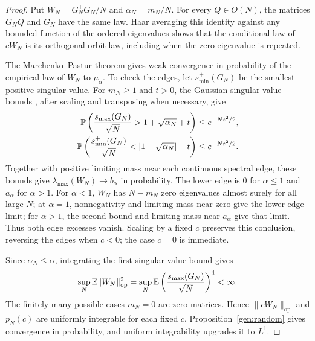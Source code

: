 \begin{proof}
Put $W_N=G_N^{\mathsf T}G_N/N$ and $\alpha_N=m_N/N$. For every
$Q\in O(N)$, the matrices $G_NQ$ and $G_N$ have the same law.
Haar averaging this identity against any bounded function of the
ordered eigenvalues shows that the conditional law of $cW_N$ is its
orthogonal orbit law, including when the zero eigenvalue is repeated.

The Marchenko--Pastur theorem
\cite[Theorem~1 and the examples on pp.~459 and 461]{MarchenkoPastur1967}
gives weak convergence in probability of the empirical law of $W_N$
to $\mu_\alpha$. To check the edges, let $s_{\min}^+(G_N)$ be the
smallest positive singular value. For $m_N\ge1$ and $t>0$, the Gaussian
singular-value bounds \cite[Theorem~II.13]{DavidsonSzarek2001}, after
scaling and transposing when necessary, give
\begin{align*}
 \mathbb P\left(\frac{s_{\max}(G_N)}{\sqrt N}>
        1+\sqrt{\alpha_N}+t\right)&\le e^{-Nt^2/2},\\
 \mathbb P\left(\frac{s_{\min}^+(G_N)}{\sqrt N}<
        |1-\sqrt{\alpha_N}|-t\right)&\le e^{-Nt^2/2}.
\end{align*}
Together with positive limiting mass near each continuous spectral edge,
these bounds give $\lambda_{\max}(W_N)\to b_\alpha$ in probability.
The lower edge is $0$ for $\alpha\le1$ and $a_\alpha$ for $\alpha>1$.
For $\alpha<1$, $W_N$ has $N-m_N$ zero eigenvalues almost surely for
all large $N$; at $\alpha=1$, nonnegativity and limiting mass near zero
give the lower-edge limit; for $\alpha>1$, the second bound and limiting
mass near $a_\alpha$ give that limit. Thus both edge excesses vanish.
Scaling by a fixed $c$ preserves this conclusion, reversing the edges
when $c<0$; the case $c=0$ is immediate.

Since $\alpha_N\le\alpha$, integrating the first singular-value bound
gives
\[
 \sup_N\mathbb E\|W_N\|_{\mathrm{op}}^2
 =\sup_N\mathbb E\left(\frac{s_{\max}(G_N)}{\sqrt N}\right)^4<\infty.
\]
The finitely many possible cases $m_N=0$ are zero matrices. Hence
$\|cW_N\|_{\mathrm{op}}$ and $p_N(c)$ are uniformly integrable for
each fixed $c$. Proposition~\ref{gen:random} gives convergence in
probability, and uniform integrability upgrades it to $L^1$.


\end{proof}
